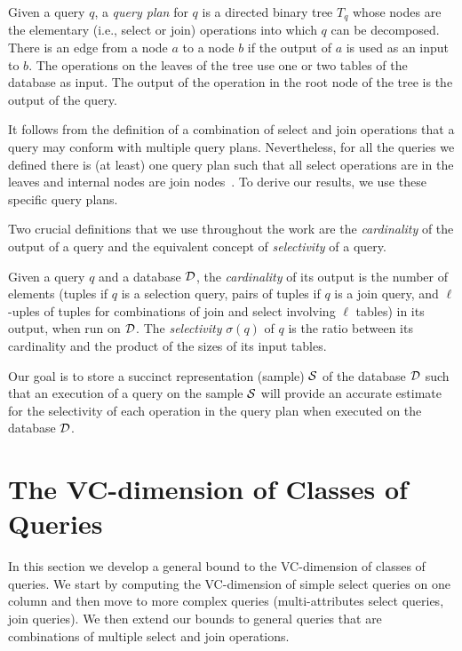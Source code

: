 \begin{definition}\label{def:exectree}
  Given a query $q$, a \emph{query plan} for $q$ is a directed binary tree
  $T_q$ whose nodes are the elementary (i.e., select or join) operations into
  which $q$ can be decomposed. There is an edge from a node $a$ to a node $b$ if
  the output of $a$ is used as an input to $b$. The operations on the leaves of
  the tree use one or two tables of the database as input. The output of the
  operation in the root node of the tree is the output of the query.
\end{definition}

It follows from the definition of a combination of select and join operations
that a query may conform with multiple query plans. Nevertheless, for all the
queries we defined there is (at least) one query plan such that all select
operations are in the leaves and internal nodes are join
nodes~\citep{GarciaMolinaUW02}. To derive our results, we use these specific
query plans.

Two crucial definitions that we use throughout the work are the 
\emph{cardinality} of the output of a query and the equivalent concept of
\emph{selectivity} of a query.

\begin{definition}\label{def:cardsel}
  Given a query $q$ and a database ${\cal D}$, the \emph{cardinality} of its output
  is the number of elements (tuples if $q$ is a selection query, pairs of
  tuples if $q$ is a join query, and $\ell$-uples of tuples for combinations of
  join and select involving $\ell$ tables) in its output, when run on ${\cal D}$. The
  \emph{selectivity} $\sigma(q)$ of $q$ is the ratio between its cardinality and
  the product of the sizes of its input tables.
 \end{definition}

Our goal is to store a succinct representation (sample) ${\cal S}$ of
the database ${\cal D}$ such that an execution of a query on the sample ${\cal S}$ will
provide an accurate estimate for the selectivity of
each operation in the query plan when executed on the database ${\cal D}$. 

\section{The VC-dimension of Classes of Queries}\label{sec:vcfreqvcdimqueries}
In this section we develop a general bound to the VC-dimension of classes of
queries. We start by computing the VC-dimension of simple select queries on one
column and then move to more complex queries (multi-attributes select
queries, join queries). We then extend our bounds to general queries that are
combinations of multiple select and join operations.

